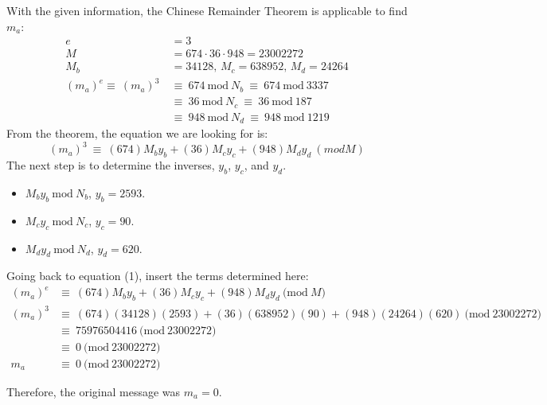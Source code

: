 \documentclass[fleqn]{article}
\begin{document}
With the given information, the Chinese Remainder Theorem is applicable to find $m_{a}$:
\begin{align*}
e &= 3\\
M &=674 \cdot 36 \cdot 948 = 23002272\\
M_{b}&= 34128 \text{, } M_{c} = 638952 \text{, } M_{d}=24264\\
(m_{a})^{e} \equiv\ (m_{a})^{3}\ &\equiv\ 674\ \textrm{mod}\ N_{b}\ \equiv\ 674\ \textrm{mod}\ 3337\\
&\equiv\ 36\ \textrm{mod}\ N_{c}\ \equiv\ 36\ \textrm{mod}\ 187\\
&\equiv\ 948\ \textrm{mod}\ N_{d}\ \equiv\ 948\ \textrm{mod}\ 1219
\end{align*}
From the theorem, the equation we are looking for is:
\begin{equation}
(m_{a})^{3}\ \equiv\ (674)M_{b}y_{b} + (36)M_{c}y_{c} + (948)M_{d}y_{d}\ (mod M)
\end{equation}
The next step is to determine the inverses, $y_{b}$, $y_{c}$, and $y_{d}$.
\begin{itemize}
\item $M_{b}y_{b}\ \textrm{mod}\ N_{b}$, $y_{b}=2593$.
\item $M_{c}y_{c}\ \textrm{mod}\ N_{c}$, $y_{c}=90$.
\item $M_{d}y_{d}\ \textrm{mod}\ N_{d}$, $y_{d}=620$.
\end{itemize}
Going back to equation (1), insert the terms determined here:
\begin{align*}
(m_a)^{e} &\equiv\ (674)M_{b}y_{b} + (36)M_{c}y_{c} + (948)M_{d}y_{d}\ \textrm{(mod}\ M\textrm{)}\\
(m_a)^{3} &\equiv\ (674)(34128)(2593) + (36)(638952)(90) + (948)(24264)(620)\ \textrm{(mod}\ 23002272\textrm{)}\\
&\equiv\ 75976504416\ \textrm{(mod}\ 23002272 \textrm{)}\\
&\equiv\ 0\ \textrm{(mod}\ 23002272 \textrm{)}\\
m_a &\equiv\ 0\ \textrm{(mod}\ 23002272 \textrm{)}
\end{align*}

Therefore, the original message was $m_a = 0$.
\end{document}
